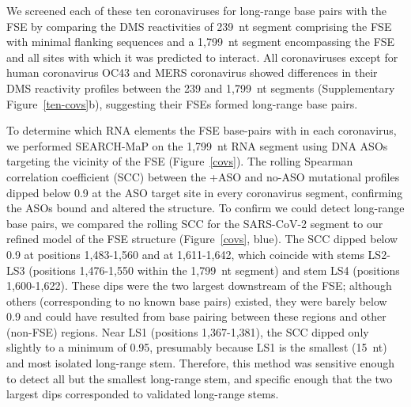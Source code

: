 \documentclass[main.tex]{subfiles}
\begin{document}
We screened each of these ten coronaviruses for long-range base pairs with the FSE by comparing the DMS reactivities of 239~nt segment comprising the FSE with minimal flanking sequences and a 1,799~nt segment encompassing the FSE and all sites with which it was predicted to interact.
All coronaviruses except for human coronavirus OC43 and MERS coronavirus showed differences in their DMS reactivity profiles between the 239 and 1,799~nt segments (Supplementary Figure~\ref{ten-covs}b), suggesting their FSEs formed long-range base pairs.

To determine which RNA elements the FSE base-pairs with in each coronavirus, we performed SEARCH-MaP on the 1,799~nt RNA segment using DNA ASOs targeting the vicinity of the FSE (Figure~\ref{covs}).
The rolling Spearman correlation coefficient (SCC) between the +ASO and no-ASO mutational profiles dipped below 0.9 at the ASO target site in every coronavirus segment, confirming the ASOs bound and altered the structure.
To confirm we could detect long-range base pairs, we compared the rolling SCC for the SARS-CoV-2 segment to our refined model of the FSE structure (Figure~\ref{covs}, blue).
The SCC dipped below 0.9 at positions 1,483-1,560 and at 1,611-1,642, which coincide with stems LS2-LS3 (positions 1,476-1,550 within the 1,799~nt segment) and stem LS4 (positions 1,600-1,622).
These dips were the two largest downstream of the FSE; although others (corresponding to no known base pairs) existed, they were barely below 0.9 and could have resulted from base pairing between these regions and other (non-FSE) regions.
Near LS1 (positions 1,367-1,381), the SCC dipped only slightly to a minimum of 0.95, presumably because LS1 is the smallest (15~nt) and most isolated long-range stem.
Therefore, this method was sensitive enough to detect all but the smallest long-range stem, and specific enough that the two largest dips corresponded to validated long-range stems.
\end{document}
